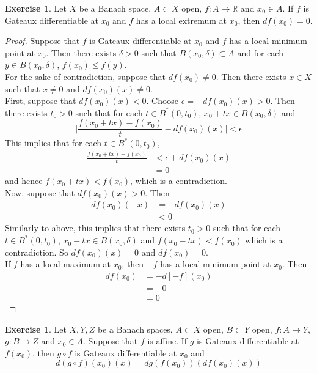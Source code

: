 \documentclass[12pt]{amsart}
\theoremstyle{definition}
\newtheorem{ex}[definition]{Exercise}
\newcommand{\del}{\delta}
\newcommand{\ep}{\epsilon}
\newcommand{\R}{\mathbb{R}}
\DeclareMathOperator*{\0}{\mbf{0}}
\DeclareMathOperator*{\1}{\mbf{1}}
\newcommand{\lex}[1]{\label{ex:#1}}
\begin{document}
	\begin{ex} \lex{61010}
	Let $X$ be a Banach space, $A \subset X$ open, $f:A \rightarrow \R$ and $x_0 \in A$. If $f$ is Gateaux differentiable at $x_0$ and $f$ has a local extremum at $x_0$, then $df(x_0) = 0$.
	\end{ex}	
	
	\begin{proof}
	Suppose that $f$ is Gateaux differentiable at $x_0$ and $f$ has a local minimum point at $x_0$. Then there exists $\del >0 $ such that $B(x_0, \del) \subset A$ and for each $y \in B(x_0, \del)$, $f(x_0) \leq f(y)$. \\
	For the sake of contradiction, suppose that $df(x_0) \neq 0$. Then there exists $x \in X$ such that $x \neq 0$ and $df(x_0)(x) \neq 0$. \\
	First, suppose that $df(x_0)(x) < 0$. Choose $\ep = -df(x_0)(x) >0$. Then there exists $t_0 >0$ such that for each $t \in B^*(0, t_0)$, $x_0 + tx \in B(x_0, \del)$ and $$\bigg | \frac{f(x_0 + tx) - f(x_0)}{t} - df(x_0)(x) \bigg | < \ep$$ 
	This implies that for each $t \in B^*(0, t_0)$,
	\begin{align*}
	\frac{f(x_0 + tx) - f(x_0)}{t}  
	&< \ep + df(x_0)(x) \\
	&= 0
	\end{align*} 
	and hence $f(x_0 + tx) < f(x_0)$, which is a contradiction. \\
	Now, suppose that $df(x_0)(x) > 0$. Then 
	\begin{align*}
	df(x_0)(-x) 
	&= -df(x_0)(x) \\
	& < 0
	\end{align*}
	Similarly to above, this implies that there exists $t_0 >0$ such that for each $t \in B^*(0, t_0)$, $x_0 - tx \in B(x_0, \del)$ and $f(x_0 - tx) < f(x_0)$ which is a contradiction. So $df(x_0)(x) = 0$ and $df(x_0) = 0$. \\
	If $f$ has a local maximum at $x_0$, then $-f$ has a local minimum point at $x_0$. Then 
	\begin{align*}
	df(x_0)
	&= -d[-f](x_0) \\
	&= -0 \\
	&= 0
\end{align*}	 
	\end{proof}
	
	\begin{ex} \lex{61011}
	Let $X, Y, Z$ be a Banach spaces, $A \subset X$ open, $B \subset Y$ open, $f:A \rightarrow Y$, $g:B \rightarrow Z$ and $x_0 \in A$. Suppose that $f$ is affine. If $g$ is Gateaux differentiable at $f(x_0)$, then $g \circ f$ is Gateaux differentiable at $x_0$ and $$d(g \circ f)(x_0)(x) = dg(f(x_0))(df(x_0)(x))$$
	\end{ex}
	
\end{document}
